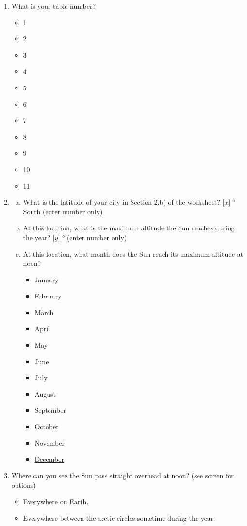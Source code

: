 \documentclass[12pt]{article}
\begin{document}
\begin{enumerate}
\item
What is your table number?
\begin{itemize}
    \item 1
    \item 2
    \item 3
    \item 4
    \item 5
    \item 6
    \item 7
    \item 8
    \item 9
    \item 10
    \item 11
\end{itemize}
\item
\begin{enumerate}[a.]
    \item
    What is the latitude of your city in Section 2.b) of the worksheet? [$x$] \si{\degree} South (enter number only)
    \item
    At this location, what is the maximum altitude the Sun reaches during the year? [$y$] \si{\degree} (enter number only)
    \item
    At this location, what month does the Sun reach its maximum altitude at noon?
    \begin{itemize}
        \item January
        \item February
        \item March
        \item April
        \item May
        \item June
        \item July
        \item August
        \item September
        \item October
        \item November
        \item \underline{December}
    \end{itemize}
\end{enumerate}
\item
Where can you see the Sun pass straight overhead at noon? (see screen for options)
\begin{itemize}
    \item Everywhere on Earth.
    \item Everywhere between the arctic circles sometime during the year. 

\end{itemize}
\end{enumerate}
\end{document}
